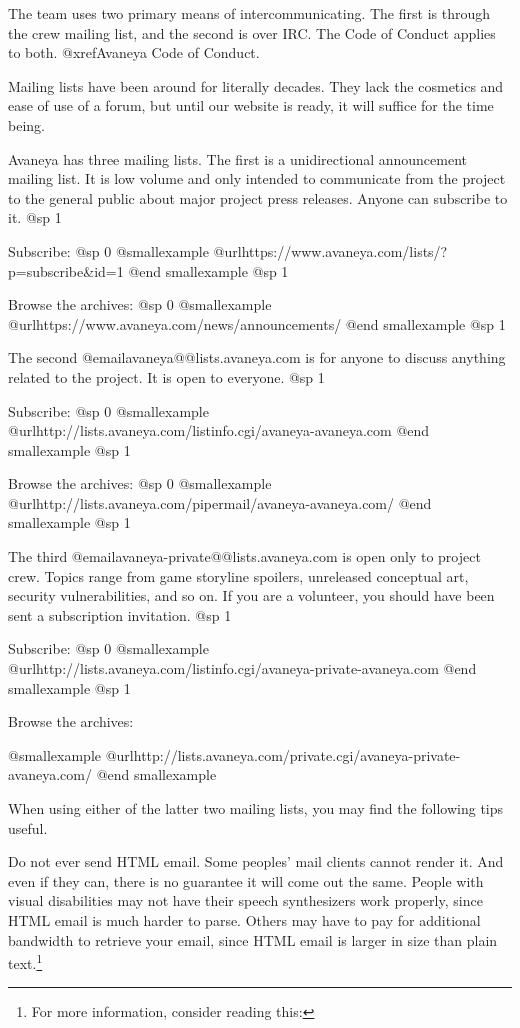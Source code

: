 The team uses two primary means of intercommunicating. The first is through the crew mailing list, and the second is over IRC. The Code of Conduct applies to both. @xref{Avaneya Code of Conduct}.

Mailing lists have been around for literally decades. They lack the cosmetics and ease of use of a forum, but until our website is ready, it will suffice for the time being.

Avaneya has three mailing lists. The first is a unidirectional announcement mailing list. It is low volume and only intended to communicate from the project to the general public about major project press releases. Anyone can subscribe to it.
@sp 1

Subscribe:
@sp 0
@smallexample
@url{https://www.avaneya.com/lists/?p=subscribe&id=1} 
@end smallexample
@sp 1

Browse the archives:
@sp 0
@smallexample
@url{https://www.avaneya.com/news/announcements/}
@end smallexample
@sp 1

The second @email{avaneya@@lists.avaneya.com} is for anyone to discuss anything related to the project. It is open to everyone.
@sp 1

Subscribe:
@sp 0
@smallexample
@url{http://lists.avaneya.com/listinfo.cgi/avaneya-avaneya.com} 
@end smallexample
@sp 1

Browse the archives:
@sp 0
@smallexample
@url{http://lists.avaneya.com/pipermail/avaneya-avaneya.com/}
@end smallexample
@sp 1

The third @email{avaneya-private@@lists.avaneya.com} is open only to project crew. Topics range from game storyline spoilers, unreleased conceptual art, security vulnerabilities, and so on. If you are a volunteer, you should have been sent a subscription invitation.
@sp 1

Subscribe:
@sp 0
@smallexample
@url{http://lists.avaneya.com/listinfo.cgi/avaneya-private-avaneya.com} 
@end smallexample
@sp 1

Browse the archives:

@smallexample
@url{http://lists.avaneya.com/private.cgi/avaneya-private-avaneya.com/}
@end smallexample

When using either of the latter two mailing lists, you may find the following tips useful.

\startitemize
\item
Do not ever send HTML email. Some peoples' mail clients cannot render it. And even if they can, there is no guarantee it will come out the same. People with visual disabilities may not have their speech synthesizers work properly, since HTML email is much harder to parse. Others may have to pay for additional bandwidth to retrieve your email, since HTML email is larger in size than plain text.\footnote{For more information, consider reading this: }

